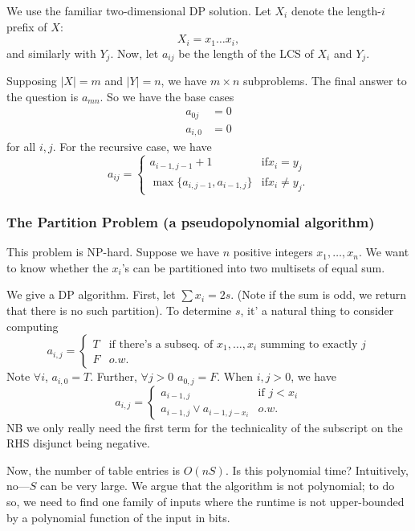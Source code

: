 \documentclass{article}
\newcommand{\beq}{\begin{equation}}
\newcommand{\eeq}{\end{equation}}
\begin{document}
We use the familiar two-dimensional DP solution.
Let $X_i$ denote the length-$i$ prefix of $X$:
$$
X_i = x_1\dots x_i,
$$
and similarly with $Y_j$.
Now, let
$a_{ij}$ be the length of the LCS of $X_i$ and $Y_j$.

Supposing $|X| = m$ and $|Y| = n$, we have $m\times n$ subproblems.
The final answer to the question is $a_{mn}$.
So we have the base cases
\begin{align*}
a_{0j} &= 0 \\
a_{i,0} &= 0
\end{align*}
for all $i,j$.
For the recursive case, we have
\begin{equation}
a_{ij} =
\left\{
	\begin{array}{ll}
		a_{i-1,j-1} + 1 & \mathrm{if } x_i = y_j \\
		\max\{a_{i,j-1}, a_{i-1,j}\} & \mathrm{if } x_i \neq y_j.
	\end{array}
\right.
\end{equation}




\subsubsection{The Partition Problem (a pseudopolynomial algorithm)}

This problem is NP-hard.
Suppose we have $n$ positive integers $x_1, \ldots, x_n$.
We want to know whether the $x_i$'s can be partitioned into two multisets
of equal sum.

We give a DP algorithm.
First, let $\sum x_i = 2s$.
(Note if the sum is odd, we return that there is no such partition).
To determine $s$, it' a natural thing to consider computing
\beq
a_{i,j} = \left\{
\begin{array}{ll}
	T & \textrm{if there's a subseq. of $x_1,\ldots,x_i$ summing to exactly $j$} \\
	F & o.w.
\end{array}
\right.
\eeq
Note $\forall i$, $a_{i,0} = T$.
Further, $\forall j > 0$ $a_{0,j} = F$.
When $i,j > 0$, we have
\beq
a_{i,j} = \left\{
\begin{array}{ll}
	a_{i-1,j} & 
	\textrm{if } j < x_i
	\\
	a_{i-1,j} \vee a_{i-1,j-x_i}
	& o.w.
\end{array}
\right.
\eeq
NB we only really need the first term for the technicality of the subscript
on the RHS disjunct being negative.

Now, the number of table entries is $O(nS)$.
Is this polynomial time?
Intuitively, no---$S$ can be very large.
We argue that the algorithm is not polynomial; to do so, we need to find
one family of inputs where the runtime is not upper-bounded by a polynomial
function of the input in bits.
\end{document}
